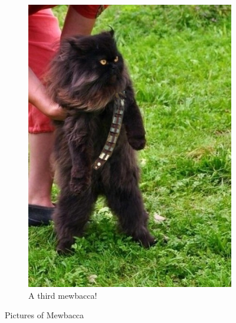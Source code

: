 \documentclass[12pt,a4paper]{article}
\begin{document}
\begin{figure}[ht!]
\begin{subfigure}[b]{0.3\textwidth}
                    \includegraphics[width=\textwidth]{mewbacca.jpg}
                    \caption{A third mewbacca!}
                    \label{fig:mewsub3}
            \end{subfigure}
            \caption{Pictures of Mewbacca}\label{fig:threemewbaccas}
    \end{figure}
\end{document}
